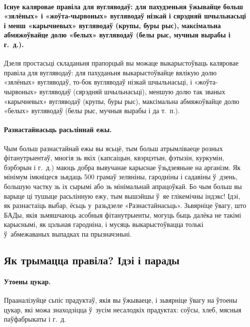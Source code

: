 \paragraph{Існуе каляровае правіла для вугляводаў: для пахудзеньня ўжывайце больш «зялёных» і «жоўта-чырвоных» вугляводаў нізкай і сярэдняй шчыльнасьці і менш «карычневых» вугляводаў (крупы, буры рыс), максімальна абмяжоўвайце долю «белых» вугляводаў (белы рыс, мучныя вырабы і г.~д.).}

Дзеля простасьці складаньня прапорцый вы можаце выкарыстоўваць каляровае правіла для вугляводаў: для пахуданьня выкарыстоўвайце вялікую долю «зялёных» вугляводаў, то-бок вугляводаў нізкай шчыльнасьці, і «жоўта-чырвоных» вугляводаў (сярэдняй шчыльнасьці), меншую долю так званых «карычневых» вугляводаў (крупы, буры рыс), максімальна абмяжоўвайце долю «белых» вугляводаў (белы рыс, мучныя вырабы і да т.~п.).

\paragraph{Разнастайнасьць расьліннай ежы.}
Чым больш разнастайнай ежы вы ясьцё, тым больш атрымліваеце розных фітанутрыентаў, многія зь якіх (капсаіцын, квэрцэтын, фэтызін, куркумін, бэрбэрын і г.~д.) маюць добра вывучанае карыснае ўзьдзеяньне на арганізм. Як мінімум імкніцеся зьядаць 500 грамаў зеляніны, гародніны і садавіны ў~дзень, большую частку зь іх сырымі або зь мінімальнай апрацоўкай. Бо чым больш вы варыце ці тушыце расьлінную ежу, тым вышэйшы ў~яе глікемічны індэкс! Ідэі, як разнастаіць выбар, ёсьць у~разьдзеле «Разнастайнасьць». Зьвярніце ўвагу, што БАДы, якія зьмяшчаюць асобныя фітанутрыенты, могуць быць далёка не такімі карыснымі, як цэльная гародніна, і мусяць выкарыстоўвацца толькі ў~абмежаваных выпадках па прызначэньні.

\subsection{Як трымацца правіла? Ідэі і парады}

\paragraph{Утоены цукар.}
Прааналізуйце сьпіс прадуктаў, якія вы ўжываеце, і зьвярніце ўвагу на ўтоены цукар, які можа знаходзіцца ў~зусім несалодкіх прадуктах: соўсы, хлеб, мясныя паўфабрыкаты і г.~д.

